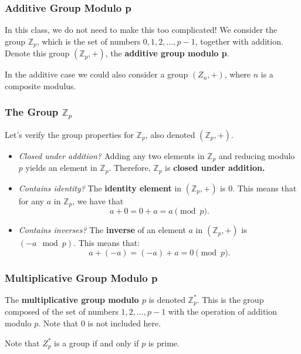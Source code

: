 \documentclass{beamer}
\newcommand{\<}{\langle}
\renewcommand{\>}{\rangle}
\newcommand{\Z}{\mathbb{Z}}
\begin{document}
\begin{frame}
\frametitle{Additive Group Modulo p}

In this class, we do not need to make this too complicated! We consider the group $\mathbb{Z}_p$, which is the set of numbers $0, 1, 2, \dots, p-1$, together with addition. Denote this group $(\mathbb{Z}_p, +)$, the \textbf{additive group modulo p}.\newline

In the additive case we could also consider a group $(Z_n, +)$, where $n$ is a composite modulus.
\end{frame}

\begin{frame}
\frametitle{The Group $\mathbb{Z}_p$}

Let's verify the group properties for $\Z_p$, also denoted $(\mathbb{Z}_p, +)$.
\begin{itemize}
\item \emph{Closed under addition?} Adding any two elements in $\Z_p$ and reducing modulo $p$ yields an element in $\Z_p$. Therefore, $\Z_p$ is \textbf{closed under addition.}
\item \emph{Contains identity?} The \textbf{identity element} in $(\Z_p, +)$ is $0$. This means that for any $a$ in $\Z_p$, we have that 
\[a + 0 = 0+ a = a\pmod p.\]
\item {\emph{Contains inverses?}} The \textbf{inverse} of an element $a$ in $(\Z_p, +)$ is $(-a \mod p)$. This means that:
\[
a + (-a) = (-a) + a = 0 \pmod p.
\]
\end{itemize}
\end{frame}

\begin{frame}
\frametitle{Multiplicative Group Modulo p}

The \textbf{multiplicative group modulo $p$} is denoted $\Z_p^*$. This is the group composed of the set of numbers $1, 2, \dots, p-1$ with the operation of addition modulo $p$. Note that $0$ is not included here. \newline

Note that $Z_p^*$ is a group if and only if $p$ is prime.
\end{frame}
\end{document}
